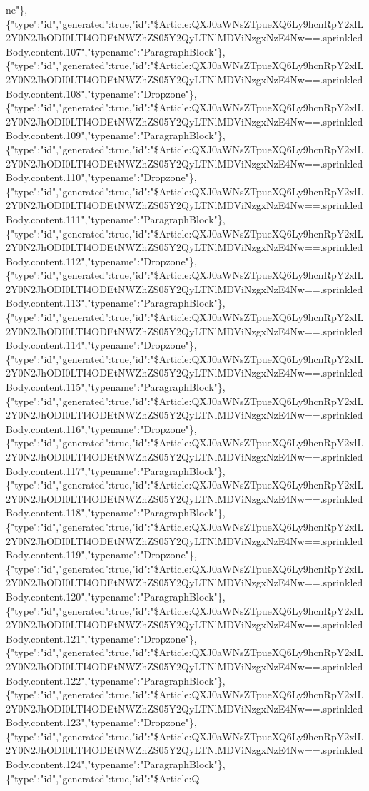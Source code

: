 ne"\},\{"type":"id","generated":true,"id":"\$Article:QXJ0aWNsZTpueXQ6Ly9hcnRpY2xlL2Y0N2JhODI0LTI4ODEtNWZhZS05Y2QyLTNlMDViNzgxNzE4Nw==.sprinkledBody.content.107","typename":"ParagraphBlock"\},\{"type":"id","generated":true,"id":"\$Article:QXJ0aWNsZTpueXQ6Ly9hcnRpY2xlL2Y0N2JhODI0LTI4ODEtNWZhZS05Y2QyLTNlMDViNzgxNzE4Nw==.sprinkledBody.content.108","typename":"Dropzone"\},\{"type":"id","generated":true,"id":"\$Article:QXJ0aWNsZTpueXQ6Ly9hcnRpY2xlL2Y0N2JhODI0LTI4ODEtNWZhZS05Y2QyLTNlMDViNzgxNzE4Nw==.sprinkledBody.content.109","typename":"ParagraphBlock"\},\{"type":"id","generated":true,"id":"\$Article:QXJ0aWNsZTpueXQ6Ly9hcnRpY2xlL2Y0N2JhODI0LTI4ODEtNWZhZS05Y2QyLTNlMDViNzgxNzE4Nw==.sprinkledBody.content.110","typename":"Dropzone"\},\{"type":"id","generated":true,"id":"\$Article:QXJ0aWNsZTpueXQ6Ly9hcnRpY2xlL2Y0N2JhODI0LTI4ODEtNWZhZS05Y2QyLTNlMDViNzgxNzE4Nw==.sprinkledBody.content.111","typename":"ParagraphBlock"\},\{"type":"id","generated":true,"id":"\$Article:QXJ0aWNsZTpueXQ6Ly9hcnRpY2xlL2Y0N2JhODI0LTI4ODEtNWZhZS05Y2QyLTNlMDViNzgxNzE4Nw==.sprinkledBody.content.112","typename":"Dropzone"\},\{"type":"id","generated":true,"id":"\$Article:QXJ0aWNsZTpueXQ6Ly9hcnRpY2xlL2Y0N2JhODI0LTI4ODEtNWZhZS05Y2QyLTNlMDViNzgxNzE4Nw==.sprinkledBody.content.113","typename":"ParagraphBlock"\},\{"type":"id","generated":true,"id":"\$Article:QXJ0aWNsZTpueXQ6Ly9hcnRpY2xlL2Y0N2JhODI0LTI4ODEtNWZhZS05Y2QyLTNlMDViNzgxNzE4Nw==.sprinkledBody.content.114","typename":"Dropzone"\},\{"type":"id","generated":true,"id":"\$Article:QXJ0aWNsZTpueXQ6Ly9hcnRpY2xlL2Y0N2JhODI0LTI4ODEtNWZhZS05Y2QyLTNlMDViNzgxNzE4Nw==.sprinkledBody.content.115","typename":"ParagraphBlock"\},\{"type":"id","generated":true,"id":"\$Article:QXJ0aWNsZTpueXQ6Ly9hcnRpY2xlL2Y0N2JhODI0LTI4ODEtNWZhZS05Y2QyLTNlMDViNzgxNzE4Nw==.sprinkledBody.content.116","typename":"Dropzone"\},\{"type":"id","generated":true,"id":"\$Article:QXJ0aWNsZTpueXQ6Ly9hcnRpY2xlL2Y0N2JhODI0LTI4ODEtNWZhZS05Y2QyLTNlMDViNzgxNzE4Nw==.sprinkledBody.content.117","typename":"ParagraphBlock"\},\{"type":"id","generated":true,"id":"\$Article:QXJ0aWNsZTpueXQ6Ly9hcnRpY2xlL2Y0N2JhODI0LTI4ODEtNWZhZS05Y2QyLTNlMDViNzgxNzE4Nw==.sprinkledBody.content.118","typename":"ParagraphBlock"\},\{"type":"id","generated":true,"id":"\$Article:QXJ0aWNsZTpueXQ6Ly9hcnRpY2xlL2Y0N2JhODI0LTI4ODEtNWZhZS05Y2QyLTNlMDViNzgxNzE4Nw==.sprinkledBody.content.119","typename":"Dropzone"\},\{"type":"id","generated":true,"id":"\$Article:QXJ0aWNsZTpueXQ6Ly9hcnRpY2xlL2Y0N2JhODI0LTI4ODEtNWZhZS05Y2QyLTNlMDViNzgxNzE4Nw==.sprinkledBody.content.120","typename":"ParagraphBlock"\},\{"type":"id","generated":true,"id":"\$Article:QXJ0aWNsZTpueXQ6Ly9hcnRpY2xlL2Y0N2JhODI0LTI4ODEtNWZhZS05Y2QyLTNlMDViNzgxNzE4Nw==.sprinkledBody.content.121","typename":"Dropzone"\},\{"type":"id","generated":true,"id":"\$Article:QXJ0aWNsZTpueXQ6Ly9hcnRpY2xlL2Y0N2JhODI0LTI4ODEtNWZhZS05Y2QyLTNlMDViNzgxNzE4Nw==.sprinkledBody.content.122","typename":"ParagraphBlock"\},\{"type":"id","generated":true,"id":"\$Article:QXJ0aWNsZTpueXQ6Ly9hcnRpY2xlL2Y0N2JhODI0LTI4ODEtNWZhZS05Y2QyLTNlMDViNzgxNzE4Nw==.sprinkledBody.content.123","typename":"Dropzone"\},\{"type":"id","generated":true,"id":"\$Article:QXJ0aWNsZTpueXQ6Ly9hcnRpY2xlL2Y0N2JhODI0LTI4ODEtNWZhZS05Y2QyLTNlMDViNzgxNzE4Nw==.sprinkledBody.content.124","typename":"ParagraphBlock"\},\{"type":"id","generated":true,"id":"\$Article:Q